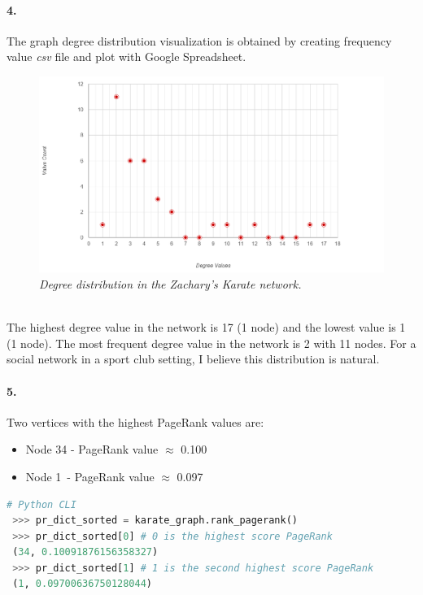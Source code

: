 \documentclass[a4paper,12pt]{article}
\begin{document}
\paragraph{4.} The graph degree distribution visualization is obtained by creating frequency value \emph{csv} file and plot with Google Spreadsheet. 
\begin{figure}[h]
    \includegraphics[width=\textwidth]{degree_dist.PNG}
    \caption{\emph{Degree distribution in the Zachary's Karate network.}}
    \label{fig:dist}
\end{figure} \\ 
The highest degree value in the network is 17 (1 node) and the lowest value is 1 (1 node). The most frequent degree value in the network is 2 with 11 nodes. For a social network in a sport club setting, I believe this distribution is natural.
\paragraph{5.} Two vertices with the highest PageRank values are: \cite{mgit}
\begin{itemize}
    \item Node 34 - PageRank value $\approx$ 0.100
    \item Node 1\ - PageRank value $\approx$ 0.097
\end{itemize}
\begin{lstlisting}[language=Python, caption={Graph PageRank calculation}]
 # Python CLI 
 >>> pr_dict_sorted = karate_graph.rank_pagerank()
 >>> pr_dict_sorted[0] # 0 is the highest score PageRank
 (34, 0.10091876156358327)
 >>> pr_dict_sorted[1] # 1 is the second highest score PageRank
 (1, 0.09700636750128044)
\end{lstlisting}
\end{document}
